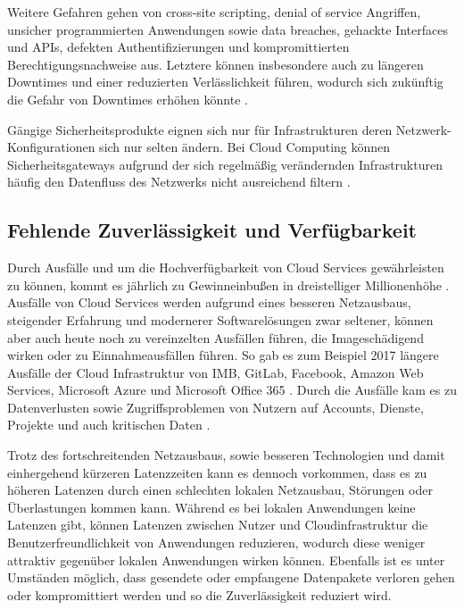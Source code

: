 Weitere Gefahren gehen von cross-site scripting, denial of service Angriffen, 
unsicher programmierten Anwendungen sowie 
data breaches, gehackte Interfaces und APIs, defekten Authentifizierungen 
und kompromittierten Berechtigungsnachweise aus. 
Letztere können insbesondere auch zu längeren Downtimes und einer reduzierten Verlässlichkeit führen, 
wodurch sich zukünftig die Gefahr von Downtimes erhöhen könnte \cite{jabbar2020}.

Gängige Sicherheitsprodukte eignen sich nur für Infrastrukturen deren Netzwerk-Konfigurationen sich nur selten ändern. Bei Cloud Computing können Sicherheitsgateways aufgrund der sich regelmäßig verändernden Infrastrukturen häufig  den Datenfluss des Netzwerks nicht ausreichend filtern \cite{wehrhahn-aklender2019}.

\subsection{Fehlende Zuverlässigkeit und Verfügbarkeit}
\label{sec:fehlende-Sicherheit}
Durch Ausfälle und um die Hochverfügbarkeit von Cloud Services gewährleisten zu können, 
kommt es jährlich zu Gewinneinbußen in dreistelliger Millionenhöhe \cite{snyder2015}.
Ausfälle von Cloud Services werden aufgrund eines besseren Netzausbaus, 
steigender Erfahrung und modernerer Softwarelösungen zwar seltener, 
können aber auch heute noch zu vereinzelten Ausfällen führen, die Imageschädigend wirken oder zu Einnahmeausfällen führen. 
So gab es zum Beispiel 2017 längere Ausfälle der Cloud Infrastruktur von 
IMB, GitLab, Facebook, Amazon Web Services, Microsoft Azure und Microsoft Office 365 \cite{tsidulko2017}.
Durch die Ausfälle kam es zu Datenverlusten sowie Zugriffsproblemen von Nutzern auf Accounts, 
Dienste, Projekte und auch kritischen Daten \cite{tsidulko2017}.

Trotz des fortschreitenden Netzausbaus, sowie besseren Technologien und damit einhergehend kürzeren Latenzzeiten kann es dennoch vorkommen, dass es zu höheren Latenzen durch einen schlechten lokalen Netzausbau, Störungen oder Überlastungen kommen kann.
Während es bei lokalen Anwendungen keine Latenzen gibt, können Latenzen zwischen Nutzer und Cloudinfrastruktur die Benutzerfreundlichkeit von Anwendungen reduzieren, wodurch diese weniger attraktiv gegenüber lokalen Anwendungen wirken können.
Ebenfalls ist es unter Umständen möglich, dass gesendete oder empfangene Datenpakete verloren gehen oder kompromittiert werden und so die Zuverlässigkeit reduziert wird. 

